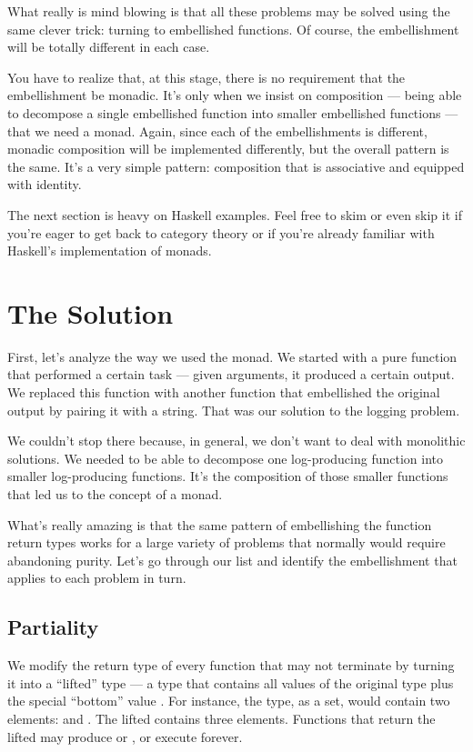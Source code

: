 What really is mind blowing is that all these problems may be solved
using the same clever trick: turning to embellished functions. Of
course, the embellishment will be totally different in each case.

You have to realize that, at this stage, there is no requirement that
the embellishment be monadic. It's only when we insist on composition
--- being able to decompose a single embellished function into smaller
embellished functions --- that we need a monad. Again, since each of the
embellishments is different, monadic composition will be implemented
differently, but the overall pattern is the same. It's a very simple
pattern: composition that is associative and equipped with identity.

The next section is heavy on Haskell examples. Feel free to skim or even
skip it if you're eager to get back to category theory or if you're
already familiar with Haskell's implementation of monads.

\section{The Solution}\label{the-solution}

First, let's analyze the way we used the  monad. We
started with a pure function that performed a certain task --- given
arguments, it produced a certain output. We replaced this function with
another function that embellished the original output by pairing it with
a string. That was our solution to the logging problem.

We couldn't stop there because, in general, we don't want to deal with
monolithic solutions. We needed to be able to decompose one
log-producing function into smaller log-producing functions. It's the
composition of those smaller functions that led us to the concept of a
monad.

What's really amazing is that the same pattern of embellishing the
function return types works for a large variety of problems that
normally would require abandoning purity. Let's go through our list and
identify the embellishment that applies to each problem in turn.

\subsection{Partiality}\label{partiality}

We modify the return type of every function that may not terminate by
turning it into a ``lifted'' type --- a type that contains all values of
the original type plus the special ``bottom'' value . For
instance, the  type, as a set, would contain two elements:
 and . The lifted  contains
three elements. Functions that return the lifted  may
produce  or , or execute forever.

